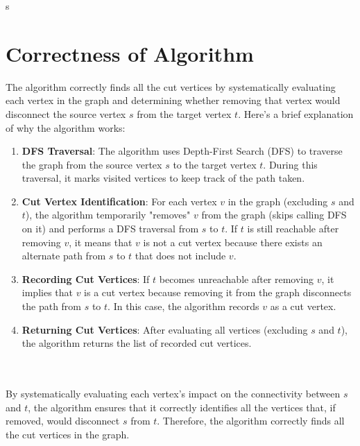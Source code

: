 s\documentclass{article}
\begin{document}
\newpage


\section*{\huge Correctness of Algorithm}


The algorithm correctly finds all the cut vertices by systematically evaluating each vertex in the graph and determining whether removing that vertex would disconnect the source vertex \( s \) from the target vertex \( t \). Here's a brief explanation of why the algorithm works:

\begin{enumerate}
    \item \textbf{DFS Traversal}: The algorithm uses Depth-First Search (DFS) to traverse the graph from the source vertex \( s \) to the target vertex \( t \). During this traversal, it marks visited vertices to keep track of the path taken.
    
    \item \textbf{Cut Vertex Identification}: For each vertex \( v \) in the graph (excluding \( s \) and \( t \)), the algorithm temporarily "removes" \( v \) from the graph (skips calling DFS on it) and performs a DFS traversal from \( s \) to \( t \). If \( t \) is still reachable after removing \( v \), it means that \( v \) is not a cut vertex because there exists an alternate path from \( s \) to \( t \) that does not include \( v \).
    
    \item \textbf{Recording Cut Vertices}: If \( t \) becomes unreachable after removing \( v \), it implies that \( v \) is a cut vertex because removing it from the graph disconnects the path from \( s \) to \( t \). In this case, the algorithm records \( v \) as a cut vertex.
    
    \item \textbf{Returning Cut Vertices}: After evaluating all vertices (excluding \( s \) and \( t \)), the algorithm returns the list of recorded cut vertices.
\end{enumerate}
\\ \\
By systematically evaluating each vertex's impact on the connectivity between \( s \) and \( t \), the algorithm ensures that it correctly identifies all the vertices that, if removed, would disconnect \( s \) from \( t \). Therefore, the algorithm correctly finds all the cut vertices in the graph.
\end{document}

